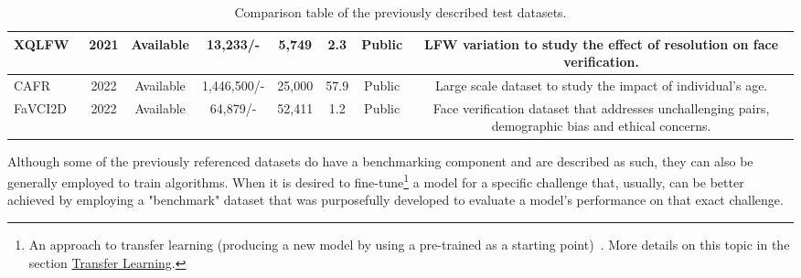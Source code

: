 \documentclass[class=report, crop=false, a4paper, 12pt]{standalone}
\begin{document}
\begin{table}[!ht]
{\begin{tabular}{|l|c|c|c|c|c|c|c|}
    XQLFW~\autocite{knocheCrossQualityLFWDatabase2021}                                  & 2021          & Available                  & 13,233/-                  & 5,749           & 2.3                  & Public                & LFW variation to study the effect of resolution on face verification.                 \\ \hline
    CAFR~\autocite{zhaoAgeInvariantFaceRecognition2022}                                   & 2022          & Available                  & 1,446,500/-                  & 25,000            & 57.9                 & Public                & Large scale dataset to study the impact of individual's age.                 \\ \hline
    FaVCI2D~\autocite{popescuFaceVerificationChallenging2022}                                & 2022          & Available                  & 64,879/-                 & 52,411             & 1.2                    & Public                & Face verification dataset that addresses unchallenging pairs, demographic bias and ethical concerns.                 \\ \hline
    \end{tabular}%
    }
    \caption{Comparison table of the previously described test datasets.}
    \label{tab:test data}
\end{table}

\vspace{\baselineskip}
\par Although some of the previously referenced datasets do have a benchmarking component and are described as such, they can also be generally employed to train algorithms. When it is desired to fine-tune\footnote{An approach to transfer learning (producing a new model by using a pre-trained as a starting point)~\autocite{zhuangComprehensiveSurveyTransfer2020}. More details on this topic in the section \hyperref[transf learning]{Transfer Learning}.} a model for a specific challenge that, usually,  can be better achieved by employing a "benchmark" dataset that was purposefully developed to evaluate a model's performance on that exact challenge. 

\vspace{\baselineskip}
\centerline{
    \noindent
}
\end{document}
